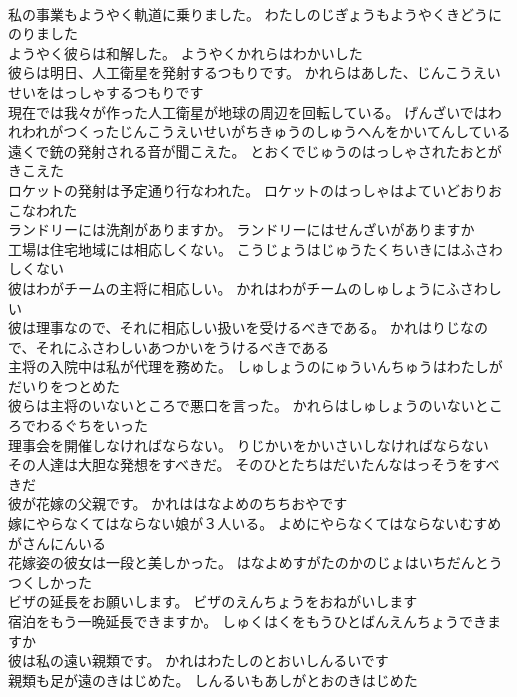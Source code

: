 \documentclass[8pt]{extreport}
\begin{document}
\begin{CJK}{UTF8}{min}
\\	私の事業もようやく軌道に乗りました。	わたしのじぎょうもようやくきどうにのりました 
\\	ようやく彼らは和解した。	ようやくかれらはわかいした 
\\	彼らは明日、人工衛星を発射するつもりです。	かれらはあした、じんこうえいせいをはっしゃするつもりです 
\\	現在では我々が作った人工衛星が地球の周辺を回転している。	げんざいではわれわれがつくったじんこうえいせいがちきゅうのしゅうへんをかいてんしている 
\\	遠くで銃の発射される音が聞こえた。	とおくでじゅうのはっしゃされたおとがきこえた 
\\	ロケットの発射は予定通り行なわれた。	ロケットのはっしゃはよていどおりおこなわれた 
\\	ランドリーには洗剤がありますか。	ランドリーにはせんざいがありますか 
\\	工場は住宅地域には相応しくない。	こうじょうはじゅうたくちいきにはふさわしくない 
\\	彼はわがチームの主将に相応しい。	かれはわがチームのしゅしょうにふさわしい 
\\	彼は理事なので、それに相応しい扱いを受けるべきである。	かれはりじなので、それにふさわしいあつかいをうけるべきである 
\\	主将の入院中は私が代理を務めた。	しゅしょうのにゅういんちゅうはわたしがだいりをつとめた 
\\	彼らは主将のいないところで悪口を言った。	かれらはしゅしょうのいないところでわるぐちをいった 
\\	理事会を開催しなければならない。	りじかいをかいさいしなければならない 
\\	その人達は大胆な発想をすべきだ。	そのひとたちはだいたんなはっそうをすべきだ 
\\	彼が花嫁の父親です。	かれははなよめのちちおやです 
\\	嫁にやらなくてはならない娘が３人いる。	よめにやらなくてはならないむすめがさんにんいる 
\\	花嫁姿の彼女は一段と美しかった。	はなよめすがたのかのじょはいちだんとうつくしかった 
\\	ビザの延長をお願いします。	ビザのえんちょうをおねがいします 
\\	宿泊をもう一晩延長できますか。	しゅくはくをもうひとばんえんちょうできますか 
\\	彼は私の遠い親類です。	かれはわたしのとおいしんるいです 
\\	親類も足が遠のきはじめた。	しんるいもあしがとおのきはじめた 

\end{CJK}
\end{document}
